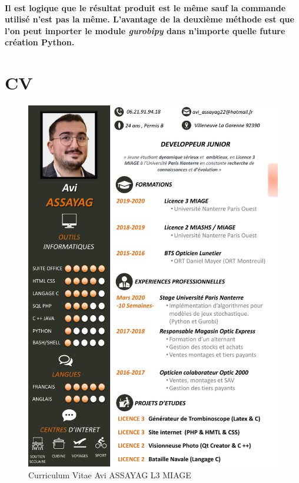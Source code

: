 \documentclass[a4paper, 12pt, twoside]{article}
\begin{document}
\paragraph{Il est logique que le résultat produit est le même sauf la commande utilisé n'est pas la même. L'avantage de la deuxième méthode est que l'on peut importer le module \textit{gurobipy} dans n'importe quelle future création Python.}
\newpage
\section{ CV}
\begin{center}
\begin{figure}[h!]
\centering
\includegraphics [scale=0.83]{CV.pdf}
\caption{Curriculum Vitae Avi ASSAYAG L3 MIAGE}
\end{figure}
\end{center}
\listoffigures\
\end{document}
